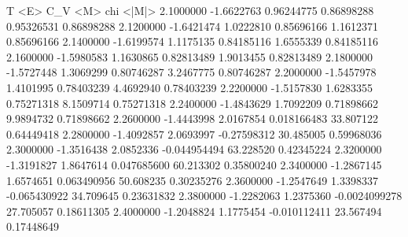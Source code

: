           T             <E>           C_V          <M>              chi            <|M|>  
      2.1000000     -1.6622763     0.96244775     0.86898288     0.95326531     0.86898288
      2.1200000     -1.6421474      1.0222810     0.85696166      1.1612371     0.85696166
      2.1400000     -1.6199574      1.1175135     0.84185116      1.6555339     0.84185116
      2.1600000     -1.5980583      1.1630865     0.82813489      1.9013455     0.82813489
      2.1800000     -1.5727448      1.3069299     0.80746287      3.2467775     0.80746287
      2.2000000     -1.5457978      1.4101995     0.78403239      4.4692940     0.78403239
      2.2200000     -1.5157830      1.6283355     0.75271318      8.1509714     0.75271318
      2.2400000     -1.4843629      1.7092209     0.71898662      9.9894732     0.71898662
      2.2600000     -1.4443998      2.0167854    0.018166483      33.807122     0.64449418
      2.2800000     -1.4092857      2.0693997    -0.27598312      30.485005     0.59968036
      2.3000000     -1.3516438      2.0852336   -0.044954494      63.228520     0.42345224
      2.3200000     -1.3191827      1.8647614    0.047685600      60.213302     0.35800240
      2.3400000     -1.2867145      1.6574651    0.063490956      50.608235     0.30235276
      2.3600000     -1.2547649      1.3398337   -0.065430922      34.709645     0.23631832
      2.3800000     -1.2282063      1.2375360  -0.0024099278      27.705057     0.18611305
      2.4000000     -1.2048824      1.1775454   -0.010112411      23.567494     0.17448649
